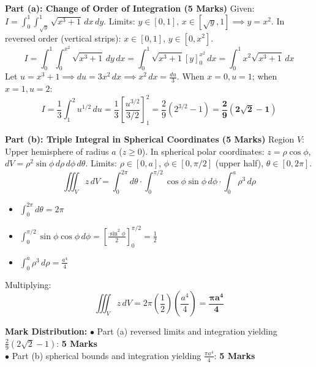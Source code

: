 \begin{solutionbox}
\textbf{Part (a): Change of Order of Integration (5 Marks)}
Given: $I = \int_0^1 \int_{\sqrt{y}}^1 \sqrt{x^3 + 1} \, dx \, dy$.
Limits: $y \in [0, 1]$, $x \in [\sqrt{y}, 1] \implies y = x^2$.
In reversed order (vertical strips):
$x \in [0, 1]$, $y \in [0, x^2]$.
\[
I = \int_0^1 \int_0^{x^2} \sqrt{x^3 + 1} \, dy \, dx = \int_0^1 \sqrt{x^3 + 1} [y]_0^{x^2} \, dx = \int_0^1 x^2 \sqrt{x^3 + 1} \, dx
\]
Let $u = x^3 + 1 \implies du = 3x^2 \, dx \implies x^2 \, dx = \frac{du}{3}$.
When $x = 0, u = 1$; when $x = 1, u = 2$:
\[
I = \frac{1}{3} \int_1^2 u^{1/2} \, du = \frac{1}{3} \left[ \frac{u^{3/2}}{3/2} \right]_1^2 = \frac{2}{9} (2^{3/2} - 1) = \mathbf{\frac{2}{9}(2\sqrt{2} - 1)}
\]

\textbf{Part (b): Triple Integral in Spherical Coordinates (5 Marks)}
Region $V$: Upper hemisphere of radius $a$ ($z \ge 0$).
In spherical polar coordinates: $z = \rho \cos\phi$, $dV = \rho^2 \sin\phi \, d\rho \, d\phi \, d\theta$.
Limits: $\rho \in [0, a]$, $\phi \in [0, \pi/2]$ (upper half), $\theta \in [0, 2\pi]$.
\[
\iiint_V z \, dV = \int_0^{2\pi} d\theta \cdot \int_0^{\pi/2} \cos\phi \sin\phi \, d\phi \cdot \int_0^a \rho^3 \, d\rho
\]
\begin{itemize}[leftmargin=6mm]
    \item $\int_0^{2\pi} d\theta = 2\pi$
    \item $\int_0^{\pi/2} \sin\phi \cos\phi \, d\phi = \left[ \frac{\sin^2\phi}{2} \right]_0^{\pi/2} = \frac{1}{2}$
    \item $\int_0^a \rho^3 \, d\rho = \frac{a^4}{4}$
\end{itemize}
Multiplying:
\[
\iiint_V z \, dV = 2\pi \left(\frac{1}{2}\right) \left(\frac{a^4}{4}\right) = \mathbf{\frac{\pi a^4}{4}}
\]

\begin{markingrubric}
\textbf{Mark Distribution:}
$\bullet$ Part (a) reversed limits and integration yielding $\frac{2}{9}(2\sqrt{2}-1)$: \textbf{5 Marks}\\
$\bullet$ Part (b) spherical bounds and integration yielding $\frac{\pi a^4}{4}$: \textbf{5 Marks}
\end{markingrubric}
\end{solutionbox}

